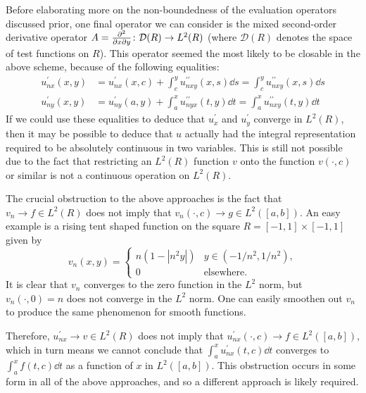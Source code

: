 \documentclass[11pt,leqno]{article}
\theoremstyle{plain}
\theoremstyle{definition}
\numberwithin{equation}{section}
\numberwithin{lem}{section}
\begin{document}
Before elaborating more on the non-boundedness of the evaluation operators discussed prior, one final operator we can consider is the mixed second-order derivative operator $A = \pdv[2]{}{x}{y}\colon \mathcal D(R)\to L^2(R)$ (where $\mathcal D(R)$ denotes the space of test functions on $R$). This operator seemed the most likely to be closable in the above scheme, because of the following equalities: 
\begin{align}
    u^\prime_{nx}(x,y) &= u^\prime_{nx}(x,c) + \int_c^y u^{\prime\prime}_{nxy}(x,s)\dd s = \int_c^y u^{\prime\prime}_{nxy}(x,s)\dd s\\
    u^\prime_{ny}(x,y) &= u^\prime_{ny}(a,y) + \int_a^x u^{\prime\prime}_{nyx}(t,y)\dd t = \int_a^x u^{\prime\prime}_{nxy}(t,y)\dd t\nonumber
\end{align}
If we could use these equalities to deduce that $u^\prime_x$ and $u^\prime_y$ converge in $L^2(R)$, then it may be possible to deduce that $u$ actually had the integral representation required to be absolutely continuous in two variables. This is still not possible due to the fact that restricting an $L^2(R)$ function $v$ onto the function $v(\cdot,c)$ or similar is not a continuous operation on $L^2(R)$.

The crucial obstruction to the above approaches is the fact that $v_n\to f\in L^2(R)$ does not imply that $v_n(\cdot,c)\to g\in L^2([a,b])$. An easy example is a rising tent shaped function on the square $R = [-1,1]\times [-1,1]$ given by \begin{equation}
    v_n(x,y) = \begin{cases}
        n(1-|n^2y|) & y\in (-1/n^2,1/n^2),\\
        0 & \text{elsewhere}.
    \end{cases}
\end{equation}
It is clear that $v_n$ converges to the zero function in the $L^2$ norm, but $v_n(\cdot,0) = n$ does not converge in the $L^2$ norm. One can easily smoothen out $v_n$ to produce the same phenomenon for smooth functions.

Therefore, $u^\prime_{nx}\to v\in L^2(R)$ does not imply that $u^\prime_{nx}(\cdot,c)\to f\in L^2([a,b])$, which in turn means we cannot conclude that $\int_a^x u^\prime_{nx}(t,c)\dd t$ converges to $\int_a^x f(t,c)\dd t$ as a function of $x$ in $L^2([a,b])$. This obstruction occurs in some form in all of the above approaches, and so a different approach is likely required.
\end{document}

